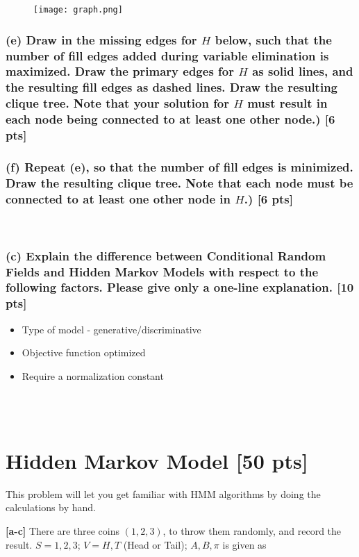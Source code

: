 \documentclass[twoside,11pt]{article}\usepackage{amsmath,amsfonts,amsthm,fullpage}
\begin{document}
\begin{figure}[h!]
\centering
\texttt{[image: graph.png]}
\label{overflow}
\end{figure}

\subsubsection*{(e) Draw in the missing edges for $H$ below, such that the number of fill edges added during variable
elimination is maximized. Draw the primary edges for $H$ as solid
lines, and the resulting fill edges as dashed lines. Draw the
resulting clique tree. Note that your solution for $H$ must result
in each node being connected to at least one other node.) [6 pts]}

\subsubsection*{(f) Repeat (e), so that the number of fill edges is minimized. Draw the resulting
clique tree. Note that each node must be connected to at least one
other node in $H$.) [6 pts]}

~\\
\fi

\subsubsection*{(c) Explain the difference between Conditional Random Fields and Hidden
Markov Models with respect to the following factors. Please give
only a one-line explanation. [10 pts]}

\begin{itemize}
  \item Type of model - generative/discriminative
  \item Objective function optimized
  \item Require a normalization constant
\end{itemize}
~\\~\\

\section{Hidden Markov Model [50 pts]}

This problem will let you get familiar with HMM algorithms by doing
the calculations by hand.

\textbf{[a-c]} There are three coins $(1,2,3)$, to throw them
randomly, and record the result. $S = {1,2,3}$; $V = {H,T}$ (Head or
Tail); $A, B, \pi$ is given as
\end{document}
